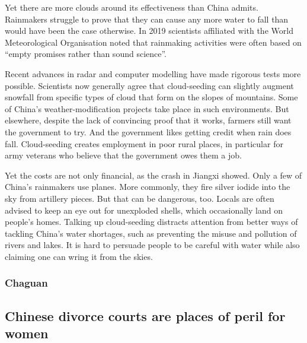 \documentclass{article}
\begin{document}
Yet there are more clouds around its effectiveness than China admits. Rainmakers struggle to prove that they can cause any more water to fall than would have been the case otherwise. In 2019 scientists affiliated with the World Meteorological Organisation noted that rainmaking activities were often based on ``empty promises rather than sound science''. 

Recent advances in radar and computer modelling have made rigorous tests more possible. Scientists now generally agree that cloud-seeding can slightly augment snowfall from specific types of cloud that form on the slopes of mountains. Some of China's weather-modification projects take place in such environments. But elsewhere, despite the lack of convincing proof that it works, farmers still want the government to try. And the government likes getting credit when rain does fall. Cloud-seeding creates employment in poor rural places, in particular for army veterans who believe that the government owes them a job. 

Yet the costs are not only financial, as the crash in Jiangxi showed. Only a few of China's rainmakers use planes. More commonly, they fire silver iodide into the sky from artillery pieces. But that can be dangerous, too. Locals are often advised to keep an eye out for unexploded shells, which occasionally land on people's homes. Talking up cloud-seeding distracts attention from better ways of tackling China's water shortages, such as preventing the misuse and pollution of rivers and lakes. It is hard to persuade people to be careful with water while also claiming one can wring it from the skies. {} 
\clearpage
\subsubsection{Chaguan }
\subsection{Chinese divorce courts are places of peril for women }
\end{document}
